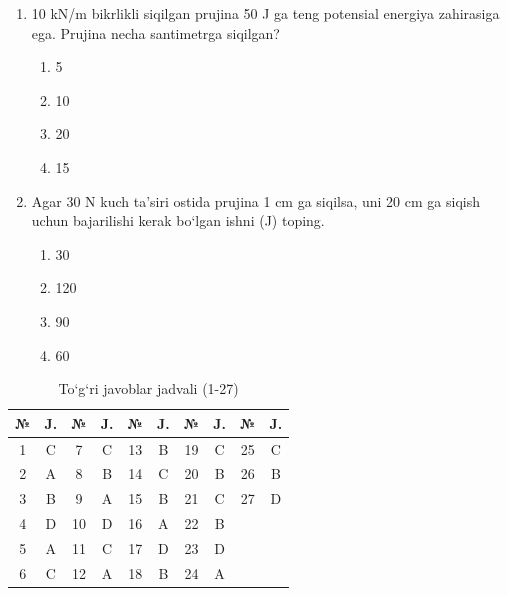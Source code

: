 \begin{enumerate}
\item 10 kN/m bikrlikli siqilgan prujina 50 J ga teng potensial energiya zahirasiga ega. Prujina necha santimetrga siqilgan?
\begin{enumerate}[label=\Alph*)]
\item 5
\item 10
\item 20
\item 15
\end{enumerate}

\item Agar 30 N kuch ta’siri ostida prujina 1 cm ga siqilsa, uni 20 cm ga siqish uchun bajarilishi kerak bo‘lgan ishni (J) toping.
\begin{enumerate}[label=\Alph*)]
\item 30
\item 120
\item 90
\item 60
\end{enumerate}

\end{enumerate}

\begin{table}[h!]
\centering
\caption{To‘g‘ri javoblar jadvali (1-27)}
\begin{tabular}{|c|c|c|c|c|c|c|c|c|c|}
\hline
№ & J. & № & J. & № & J. & № & J. & № & J. \\ \hline
1 & C & 7 & C & 13 & B & 19 & C & 25 & C \\ \hline
2 & A & 8 & B & 14 & C & 20 & B & 26 & B \\ \hline
3 & B & 9 & A & 15 & B & 21 & C & 27 & D \\ \hline
4 & D & 10 & D & 16 & A & 22 & B & & \\ \hline
5 & A & 11 & C & 17 & D & 23 & D & & \\ \hline
6 & C & 12 & A & 18 & B & 24 & A & & \\ \hline
\end{tabular}
\end{table}